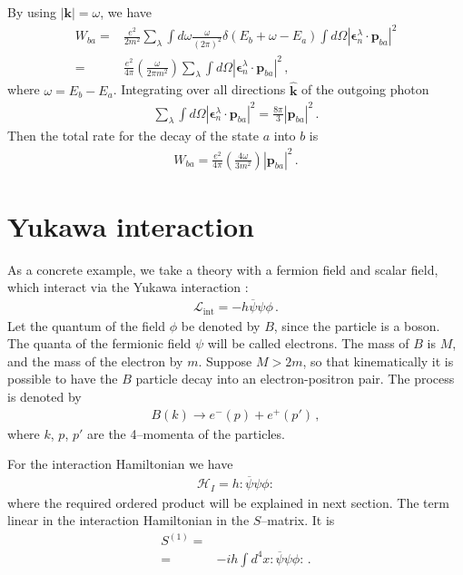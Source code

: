 By using $|\mathbf{k}|=\omega$, we have
\begin{align}
  W_{ba}=&\frac{e^2}{2m^2}\sum_{\lambda}\int d\omega\frac{\omega}{(2\pi)^2}\delta(E_b+\omega-E_a)\int d\Omega|\boldsymbol{\epsilon}^{\lambda}_{n}\cdot\mathbf{p}_{ba}|^2\nonumber\\
=&\frac{e^2}{4\pi}\left(\frac{\omega}{2\pi m^2}\right)\sum_{\lambda}\int d\Omega|\boldsymbol{\epsilon}^{\lambda}_{n}\cdot\mathbf{p}_{ba}|^2\,,
\end{align}
where $\omega=E_b-E_a$.
Integrating over all directions $\widehat{\mathbf{k}}$ of the outgoing photon
\begin{align}
  \sum_{\lambda}\int d\Omega|\boldsymbol{\epsilon}^{\lambda}_{n}\cdot\mathbf{p}_{ba}|^2=\frac{8\pi}{3}|\mathbf{p}_{ba}|^2\,.
\end{align}
Then the total rate for the decay of the state $a$ into $b$ is
\begin{align}
  W_{ba}=\frac{e^2}{4\pi}\left(\frac{4\omega}{3 m^2}\right)|\mathbf{p}_{ba}|^2\,.
\end{align}



\section{Yukawa interaction}
\label{sec:feynman-diagrams}
As a concrete example, we take a theory with a fermion field and scalar field, which interact via the Yukawa interaction \cite{Lahiri:2005sm}:
\begin{align}
\label{eq:lppp}
  \mathcal{L}_{\text{int}}=-h \overline{\psi}\psi\phi\,.
\end{align}
Let the quantum of the field $\phi$ be denoted by $B$, since the particle is a boson. The quanta of the fermionic field $\psi$ will be called electrons. The mass of $B$ is $M$, and the mass of the electron by $m$. Suppose $M\gt 2m$,  so that kinematically it is possible to have the $B$ particle decay into an electron-positron pair. The process is denoted by
\begin{align}
  B(k)\to e^-(p)+e^+(p')\,,
\end{align}
where $k$, $p$, $p'$ are the 4--momenta of the particles.

For the interaction Hamiltonian we have
\begin{align}
\label{eq:hppp}
  \mathcal{H}_I=h:\overline{\psi}\psi\phi:
\end{align}
where the required ordered product will be explained in next section.
The term linear in the interaction Hamiltonian in the $S$--matrix.  It is
\begin{align}
  S^{(1)}=\nonumber\\
=&-i h \int d^4x:\overline{\psi}\psi\phi:\,.
\end{align}


